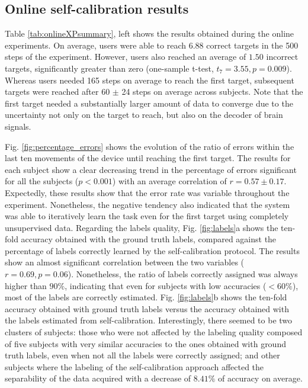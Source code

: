 \subsection{Online self-calibration results}

Table \ref{tab:onlineXPsummary}, left shows the results obtained during the online experiments. On average, users were able to reach $6.88$ correct targets in the 500 steps of the experiment. However, users also reached an average of $1.50$ incorrect targets, significantly greater than zero (one-sample t-test, $t_{7} = 3.55, p=0.009$). Whereas users needed 165 steps on average to reach the first target, subsequent targets were reached after 60 $\pm$ 24 steps on average across subjects. Note that the first target needed a substantially larger amount of data to converge due to the uncertainty not only on the target to reach, but also on the decoder of brain signals.

Fig. \ref{fig:percentage_errors} shows the evolution of the ratio of errors within the last ten movements of the device until reaching the first target. The results for each subject show a clear decreasing trend in the percentage of errors significant for all the subjects ($p<0.001$) with an average correlation of $r=0.57 \pm 0.17$. Expectedly, these results show that the error rate was variable throughout the experiment. Nonetheless, the negative tendency also indicated that the system was able to iteratively learn the task even for the first target using completely unsupervised data. Regarding the labels quality, Fig. \ref{fig:labels}a shows the ten-fold accuracy obtained with the ground truth labels, compared against the percentage of labels correctly learned by the self-calibration protocol. The results show an almost significant correlation between the two variables ($r = 0.69, p=0.06$). Nonetheless, the ratio of labels correctly assigned was always higher than $90\%$, indicating that even for subjects with low accuracies ($<60\%$), most of the labels are correctly estimated.
%
Fig. \ref{fig:labels}b shows the ten-fold accuracy obtained with ground truth labels versus the accuracy obtained with the labels estimated from self-calibration. Interestingly, there seemed to be two clusters of subjects: those who were not affected by the labeling quality composed of five subjects with very similar accuracies to the ones obtained with ground truth labels, even when not all the labels were correctly assigned; and other subjects where the labeling of the self-calibration approach affected the separability of the data acquired with a decrease of $8.41\%$ of accuracy on average.

